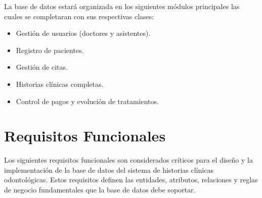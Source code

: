 \documentclass[conference]{IEEEtran}
\begin{document}
La base de datos estará organizada en los siguientes módulos principales las cuales se completaran con sus respectivas clases:

\begin{itemize}
    \item Gestión de usuarios (doctores y asistentes).
    \item Registro de pacientes.
    \item Gestión de citas.
    \item Historias clínicas completas.
    \item Control de pagos y evolución de tratamientos.
\end{itemize}

\section{Requisitos Funcionales}
Los siguientes requisitos funcionales son considerados críticos para el diseño y la implementación de la base de datos del sistema de historias clínicas odontológicas. Estos requisitos definen las entidades, atributos, relaciones y reglas de negocio fundamentales que la base de datos debe soportar.
\end{document}
